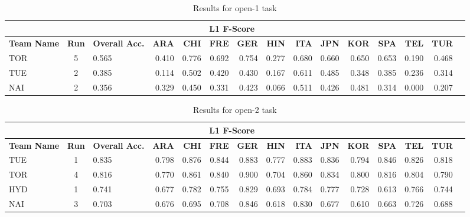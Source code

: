 \documentclass[11pt,letterpaper]{article}
\begin{document}
\begin{table*}[!htbp]
\begin{footnotesize}
\begin{tabular}{|p{1cm}|c|p{1cm}|r|r|r|r|r|r|r|r|r|r|r|r|}
\hline
\rowcolor{gray!50}
\multicolumn{3}{|c|}{} & \multicolumn{11}{c|}{\bf L1 F-Score}\\\hline
{\bf Team Name} & {\bf Run} & {\bf Overall Acc.} & {\bf ARA} & {\bf CHI} & {\bf FRE} & {\bf GER} & {\bf HIN} & {\bf ITA} & {\bf JPN} & {\bf KOR} & {\bf SPA} & {\bf TEL} & {\bf TUR}\\\hline
TOR & 5  & 0.565 & 0.410 & 0.776 & 0.692 & 0.754 & 0.277 & 0.680 & 0.660 & 0.650 & 0.653 & 0.190 & 0.468\\\hline
TUE & 2  & 0.385 & 0.114 & 0.502 & 0.420 & 0.430 & 0.167 & 0.611 & 0.485 & 0.348 & 0.385 & 0.236 & 0.314\\\hline
NAI & 2  & 0.356 & 0.329 & 0.450 & 0.331 & 0.423 & 0.066 & 0.511 & 0.426 & 0.481 & 0.314 & 0.000 & 0.207\\\hline
\end{tabular}
\caption{Results for open-1 task\label{tab:results:open1}}
\end{footnotesize}
\end{table*}


\begin{table*}[!htbp]
\begin{footnotesize}
\begin{tabular}{|p{1cm}|c|p{1cm}|r|r|r|r|r|r|r|r|r|r|r|r|}
\hline
\rowcolor{gray!50}
\multicolumn{3}{|c|}{} & \multicolumn{11}{c|}{\bf L1 F-Score}\\\hline
{\bf Team Name} & {\bf Run} & {\bf Overall Acc.} & {\bf ARA} & {\bf CHI} & {\bf FRE} & {\bf GER} & {\bf HIN} & {\bf ITA} & {\bf JPN} & {\bf KOR} & {\bf SPA} & {\bf TEL} & {\bf TUR}\\\hline
TUE & 1  & 0.835 & 0.798 & 0.876 & 0.844 & 0.883 & 0.777 & 0.883 & 0.836 & 0.794 & 0.846 & 0.826 & 0.818\\\hline
TOR& 4  & 0.816 & 0.770 & 0.861 & 0.840 & 0.900 & 0.704 & 0.860 & 0.834 & 0.800 & 0.816 & 0.804 & 0.790\\\hline
HYD & 1  & 0.741 & 0.677 & 0.782 & 0.755 & 0.829 & 0.693 & 0.784 & 0.777 & 0.728 & 0.613 & 0.766 & 0.744\\\hline
NAI & 3  & 0.703 & 0.676 & 0.695 & 0.708 & 0.846 & 0.618 & 0.830 & 0.677 & 0.610 & 0.663 & 0.726 & 0.688\\\hline
\end{tabular}
\caption{Results for open-2 task\label{tab:results:open2}}
\end{footnotesize}
\end{table*}
\end{document}
